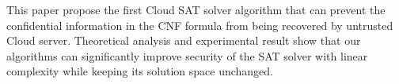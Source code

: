 \documentclass[runningheads,a4paper]{llncs}
\begin{document}
% 
This paper propose the first Cloud SAT solver algorithm 
that can prevent the confidential information in the CNF formula from being recovered by untrusted Cloud server.
Theoretical analysis and experimental result show that our algorithms can significantly improve security of the SAT solver 
with linear complexity while keeping its solution space unchanged.

% 

\end{document}
